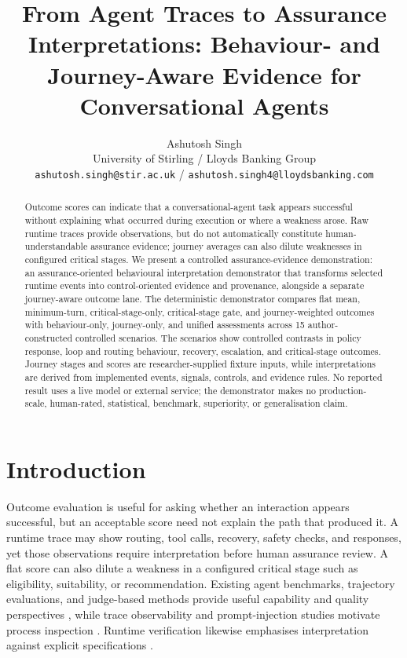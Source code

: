 \documentclass{article}
\title{From Agent Traces to Assurance Interpretations: Behaviour- and Journey-Aware Evidence for Conversational Agents}
\author{%
  Ashutosh Singh \\
  University of Stirling / Lloyds Banking Group \\
  \texttt{ashutosh.singh@stir.ac.uk} / \texttt{ashutosh.singh4@lloydsbanking.com}
}
\begin{document}
\maketitle

\begin{abstract}
Outcome scores can indicate that a conversational-agent task appears successful without explaining what occurred during execution or where a weakness arose. Raw runtime traces provide observations, but do not automatically constitute human-understandable assurance evidence; journey averages can also dilute weaknesses in configured critical stages. We present a controlled assurance-evidence demonstration: an assurance-oriented behavioural interpretation demonstrator that transforms selected runtime events into control-oriented evidence and provenance, alongside a separate journey-aware outcome lane. The deterministic demonstrator compares flat mean, minimum-turn, critical-stage-only, critical-stage gate, and journey-weighted outcomes with behaviour-only, journey-only, and unified assessments across 15 author-constructed controlled scenarios. The scenarios show controlled contrasts in policy response, loop and routing behaviour, recovery, escalation, and critical-stage outcomes. Journey stages and scores are researcher-supplied fixture inputs, while interpretations are derived from implemented events, signals, controls, and evidence rules. No reported result uses a live model or external service; the demonstrator makes no production-scale, human-rated, statistical, benchmark, superiority, or generalisation claim.
\end{abstract}

\section{Introduction}
Outcome evaluation is useful for asking whether an interaction appears successful, but an acceptable score need not explain the path that produced it. A runtime trace may show routing, tool calls, recovery, safety checks, and responses, yet those observations require interpretation before human assurance review. A flat score can also dilute a weakness in a configured critical stage such as eligibility, suitability, or recommendation. Existing agent benchmarks, trajectory evaluations, and judge-based methods provide useful capability and quality perspectives \cite{agentbench,agentboard,gaia,taubench,mtbench,llmjudge_survey,wang2025agent_eval_survey}, while trace observability and prompt-injection studies motivate process inspection \cite{langgraph_tracing,foundry_tracing,agentdojo}. Runtime verification likewise emphasises interpretation against explicit specifications \cite{leucker2009runtime}.
\end{document}
